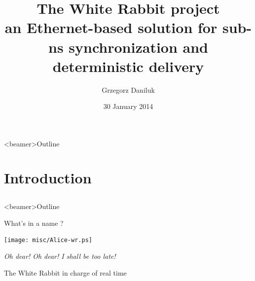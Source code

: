 \documentclass[compress,red]{beamer}
\title[White Rabbit \hspace{2em}\insertframenumber/\inserttotalframenumber]
{The White Rabbit project\\ \small an Ethernet-based solution for sub-ns synchronization and deterministic delivery}
\author[G. Daniluk]{Grzegorz Daniluk}
\institute{CERN BE-CO Hardware and Timing section}
\date{30 January 2014}
\begin{document}
\frame{\titlepage}
\begin{frame}<beamer>{Outline}
    \tableofcontents %
\end{frame}

\section{Introduction}
\subsection{}
\begin{frame}<beamer>{Outline}
    \tableofcontents [currentsection]
\end{frame}


\begin{frame}{What's in a name ?}
\begin{center}
\texttt{[image: misc/Alice-wr.ps]}
\end{center}
\begin{center}
\textit{Oh dear! Oh dear! I shall be too late!}\\
\begin{small}
The White Rabbit in charge of real time
\end{small}
\end{center}
\end{frame}
\end{document}
